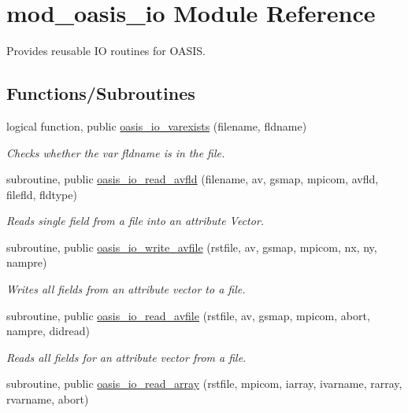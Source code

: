 \hypertarget{namespacemod__oasis__io}{}\section{mod\+\_\+oasis\+\_\+io Module Reference}
\label{namespacemod__oasis__io}


Provides reusable IO routines for O\+A\+S\+IS.  


\subsection*{Functions/\+Subroutines}
\begin{DoxyCompactItemize}
\item 
logical function, public \hyperlink{namespacemod__oasis__io_a4d0f5cb29eabc798e857127c8c174d85}{oasis\+\_\+io\+\_\+varexists} (filename, fldname)
\begin{DoxyCompactList}\small\item\em Checks whether the var fldname is in the file. \end{DoxyCompactList}\item 
subroutine, public \hyperlink{namespacemod__oasis__io_a6c14bebb7b216218e25f599e3469ae0c}{oasis\+\_\+io\+\_\+read\+\_\+avfld} (filename, av, gsmap, mpicom, avfld, filefld, fldtype)
\begin{DoxyCompactList}\small\item\em Reads single field from a file into an attribute Vector. \end{DoxyCompactList}\item 
subroutine, public \hyperlink{namespacemod__oasis__io_ad8a48d6c36e3fac637a8191c20e514f2}{oasis\+\_\+io\+\_\+write\+\_\+avfile} (rstfile, av, gsmap, mpicom, nx, ny, nampre)
\begin{DoxyCompactList}\small\item\em Writes all fields from an attribute vector to a file. \end{DoxyCompactList}\item 
subroutine, public \hyperlink{namespacemod__oasis__io_a65e17e4a065e8e4dea33754fb9c1d32c}{oasis\+\_\+io\+\_\+read\+\_\+avfile} (rstfile, av, gsmap, mpicom, abort, nampre, didread)
\begin{DoxyCompactList}\small\item\em Reads all fields for an attribute vector from a file. \end{DoxyCompactList}\item 
subroutine, public \hyperlink{namespacemod__oasis__io_a8b604f89345d74c74c6bc3b4760b2e29}{oasis\+\_\+io\+\_\+read\+\_\+array} (rstfile, mpicom, iarray, ivarname, rarray, rvarname, abort)

\end{DoxyCompactItemize}
